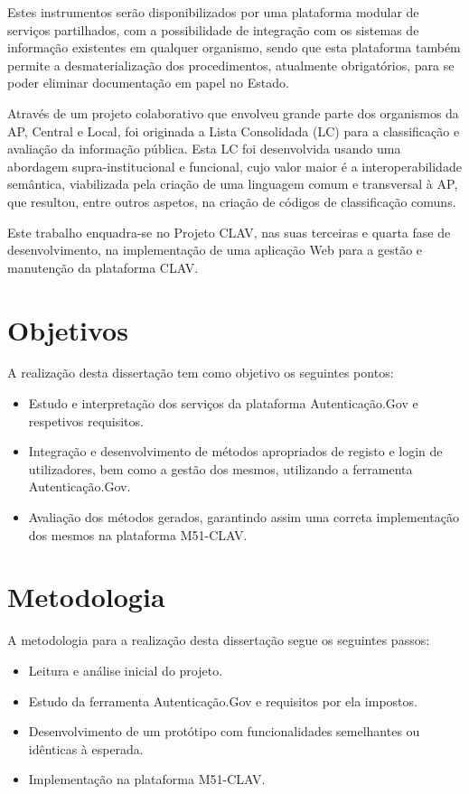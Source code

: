 Estes instrumentos serão disponibilizados por uma plataforma modular de serviços partilhados, com a possibilidade de integração com os sistemas de informação existentes em qualquer organismo, sendo que esta plataforma também permite a desmaterialização dos procedimentos, atualmente obrigatórios, para se poder eliminar documentação em papel no Estado.

Através de um projeto colaborativo que envolveu grande parte dos organismos da AP, Central e Local, foi originada a Lista Consolidada (LC) para a classificação e avaliação da informação pública. Esta LC foi desenvolvida usando uma abordagem supra-institucional e funcional, cujo valor maior é a interoperabilidade semântica, viabilizada pela criação de uma linguagem comum e transversal à AP, que resultou, entre outros aspetos, na criação de códigos de classificação comuns.

Este trabalho enquadra-se no Projeto CLAV, nas suas terceiras e quarta fase de desenvolvimento, na implementação de uma aplicação Web para a gestão e manutenção da plataforma CLAV. 


\cleardoublepage
\section{Objetivos}

A realização desta dissertação tem como objetivo os seguintes pontos:

\begin{itemize}
    \item Estudo e interpretação dos serviços da plataforma Autenticação.Gov e respetivos requisitos.
    \item Integração e desenvolvimento de métodos apropriados de registo e login de utilizadores, bem como a gestão dos mesmos, utilizando a ferramenta Autenticação.Gov.
    \item Avaliação dos métodos gerados, garantindo assim uma correta implementação dos mesmos na plataforma M51-CLAV.
\end{itemize}

\section{Metodologia}

A metodologia para a realização desta dissertação segue os seguintes passos:

\begin{itemize}
    \item Leitura e análise inicial do projeto.
    \item Estudo da ferramenta Autenticação.Gov e requisitos por ela
impostos.
    \item Desenvolvimento de um protótipo com funcionalidades
semelhantes ou idênticas à esperada.
    \item Implementação na plataforma M51-CLAV.
\end{itemize}